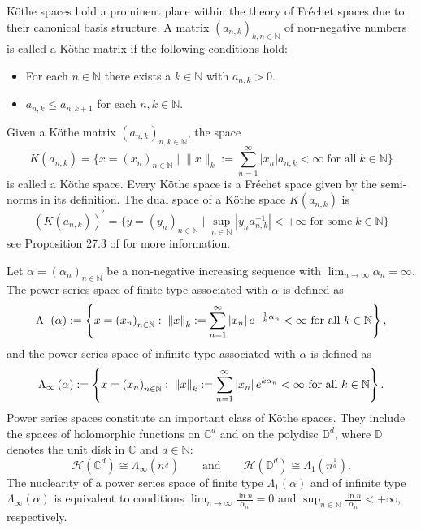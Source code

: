 \documentclass{birkjour}
\theoremstyle{definition}
\theoremstyle{remark}
\numberwithin{equation}{section}
\begin{document}
Köthe spaces hold a prominent place within the theory of Fréchet spaces due to their canonical basis structure. A matrix $(a_{n,k})_{k,n\in \mathbb{N}}$ of non-negative numbers is called a Köthe matrix if the following conditions hold:
\begin{itemize}
\item[1.] For each $n\in \mathbb{N}$ there exists a $k\in \mathbb{N}$ with $a_{n,k}>0$. 
\item[2.] $a_{n,k}\leq a_{n,k+1}$ for each $n,k\in \mathbb{N}$.
\end{itemize}
Given a Köthe matrix $(a_{n,k})_{n,k\in \mathbb{N}}$, the space
\[ K(a_{n,k})=\bigg\{ x=(x_{n})_{n\in \mathbb{N}}\; \bigg|\;\|x\|_{k}:=\sum^{\infty}_{n=1}|x_{n}|a_{n,k}< \infty \;\text{for all}\;k\in \mathbb{N} \bigg\}\]
is called a Köthe space. Every Köthe space is a Fr\'echet space given by the semi-norms
in its definition. The dual space of a Köthe space $K(a_{n,k})$ is
\[ (K(a_{n,k}))^{\prime}=\bigg\{ y=(y_{n})_{n\in \mathbb{N}}\; \bigg|\; \sup_{n\in \mathbb{N}}|y_{n}a_{n,k}^{-1}|<+\infty\; \text{for some}\; k\in \mathbb{N}\bigg\}\]
see Proposition 27.3 of \cite{MV} for more information.


Let $\alpha=\left(\alpha_{n}\right)_{n\in \mathbb{N}}$ be a non-negative increasing sequence with $\displaystyle \lim_{n\rightarrow \infty} \alpha_{n}=\infty$. The power series space of finite type associated with $\alpha$ is defined as
$$\Lambda_{1}\left(\alpha\right):=\left\{x=\left(x_{n}\right)_{n\in \mathbb{N}}: \;\left\|x\right\|_{k}:=\sum^{\infty}_{n=1}\left|x_{n}\right|e^{-{1\over k}\alpha_{n}}<\infty \textnormal{ for all } k\in \mathbb{N}\right\},$$
and the power series space of infinite type associated with $\alpha$ is defined as
$$\displaystyle \Lambda_{\infty}\left(\alpha\right):=\left\{x=\left(x_{n}\right)_{n\in \mathbb{N}}:\; \left\|x\right\|_{k}:=\sum^{\infty}_{n=1}\left|x_{n}\right|e^{k\alpha_{n}}<\infty \textnormal{ for all } k\in \mathbb{N}\right\}.$$
Power series spaces constitute an important class of Köthe spaces. They include the spaces of holomorphic functions on $\mathbb{C}^{d}$ and on the polydisc $\mathbb{D}^{d}$, where $\mathbb{D}$ denotes the unit disk in $\mathbb{C}$ and $d\in \mathbb{N}$:
\[\mathcal{H}(\mathbb{C}^{d})\cong \Lambda_{\infty}(n^{\frac{1}{d}}) \quad\quad\text{and} \quad\quad \mathcal{H}(\mathbb{D}^{d})\cong \Lambda_{1}(n^{\frac{1}{d}}).
\]
The nuclearity of a power series space of finite type $\Lambda_{1}(\alpha)$ and of infinite type $\Lambda_{\infty}(\alpha)$ is equivalent to conditions $\displaystyle\lim_{n\to \infty} \frac{\ln n}{\alpha_{n}}=0$ and $\displaystyle\sup_{n\in \mathbb{N}} \frac{\ln n}{\alpha_{n}}<+\infty$,
respectively.
 
\end{document}
